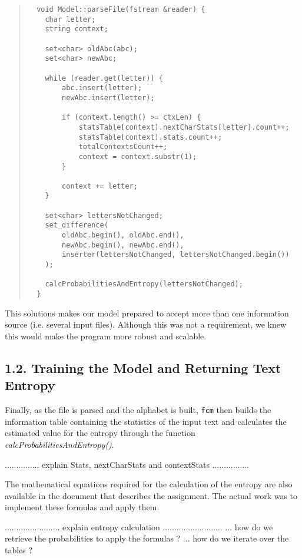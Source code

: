 \documentclass[12pt]{article}
\begin{document}
\begingroup
\addtolength\leftmargini{-0.4in}
\addtolength\baselineskip{-0.05in}
\begin{quote}
\begin{verbatim}
  void Model::parseFile(fstream &reader) {
    char letter;
    string context;

    set<char> oldAbc(abc);
    set<char> newAbc;

    while (reader.get(letter)) {
        abc.insert(letter);
        newAbc.insert(letter);

        if (context.length() >= ctxLen) {
            statsTable[context].nextCharStats[letter].count++;
            statsTable[context].stats.count++;
            totalContextsCount++;
            context = context.substr(1);
        }

        context += letter;
    }

    set<char> lettersNotChanged;
    set_difference(
        oldAbc.begin(), oldAbc.end(),
        newAbc.begin(), newAbc.end(),
        inserter(lettersNotChanged, lettersNotChanged.begin())
    );

    calcProbabilitiesAndEntropy(lettersNotChanged);
  }
\end{verbatim}
\end{quote}
\endgroup

This solutions makes our model prepared to accept more than one information
source (i.e. several input files).
Although this was not a requirement, we knew this would make the program more
robust and scalable.

\newpage

\subsection*{1.2. Training the Model and Returning Text Entropy}

Finally, as the file is parsed and the alphabet is built, \texttt{fcm} then 
builds the information table containing the statistics of the input text and
calculates the estimated value for the entropy through the function
{\it calcProbabilitiesAndEntropy()\/}.

............... explain Stats, nextCharStats and contextStats ................

The mathematical equations required for the calculation of the entropy are also 
available in the document that describes the assignment. 
The actual work was to implement these formulas and apply them.

........................ explain entropy calculation ..........................
... how do we retrieve the probabilities to apply the formulas ?
... how do we iterate over the tables ?
\end{document}
